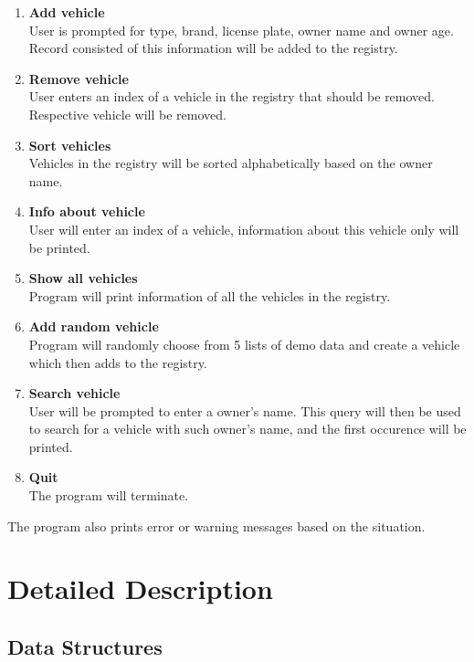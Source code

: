 \documentclass[12pt, a4paper, openright]{article}
\begin{document}
\begin{enumerate}
  \item \textbf{Add vehicle} \\
  User is prompted for type, brand, license plate, owner name and owner age. Record consisted of this information will be added to the registry.

  \item \textbf{Remove vehicle} \\
  User enters an index of a vehicle in the registry that should be removed. Respective vehicle will be removed.

  \item \textbf{Sort vehicles} \\
  Vehicles in the registry will be sorted alphabetically based on the owner name.

  \item \textbf{Info about vehicle} \\
  User will enter an index of a vehicle, information about this vehicle only will be printed.

  \item \textbf{Show all vehicles} \\
  Program will print information of all the vehicles in the registry.

  \item \textbf{Add random vehicle} \\
  Program will randomly choose from 5 lists of demo data and create a vehicle which then adds to the registry.

  \item \textbf{Search vehicle} \\
  User will be prompted to enter a owner's name. This query will then be used to search for a vehicle with such owner's name, and the first occurence will be printed.

  \item \textbf{Quit} \\
  The program will terminate.
\end{enumerate}

The program also prints error or warning messages based on the situation.

\section{Detailed Description}

\subsection*{Data Structures}
\end{document}
